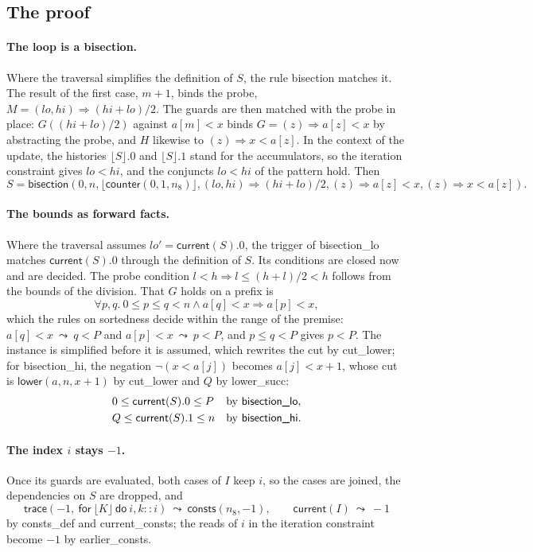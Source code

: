 \documentclass[11pt,a4paper]{article}
\newcommand{\bl}[1]{\lfloor #1\rfloor}                       %
\newcommand{\tr}[3]{\mathsf{trace}(#1,\ \mathsf{for}\ #2\ \mathsf{do}\ #3)}
\newcommand{\cnt}{\mathsf{counter}}
\newcommand{\cur}{\mathsf{current}}
\newcommand{\consts}{\mathsf{consts}}
\newcommand{\lemma}[1]{\textsf{#1}}
\newcommand{\rw}{\ \leadsto\ }
\begin{document}
\subsection{The proof}

\paragraph{The loop is a bisection.} Where the traversal simplifies the definition of $S$, the rule
\lemma{bisection} matches it. The result of the first case, $m + 1$, binds the probe,
$M = (lo, hi) \Rightarrow (hi + lo)/2$. The guards are then matched with the probe in place:
$G((hi + lo)/2)$ against $a[m] < x$ binds $G = (z) \Rightarrow a[z] < x$ by abstracting the probe, and $H$ likewise to
$(z) \Rightarrow x < a[z]$. In the context of the update, the histories $\bl{S}.0$ and $\bl{S}.1$ stand for the
accumulators, so the iteration constraint gives $lo < hi$, and the conjuncts $lo < hi$ of the pattern hold. Then
\[
S = \mathsf{bisection}(0, n, \bl{\cnt(0, 1, n_8)}, (lo, hi) \Rightarrow (hi + lo)/2,
(z) \Rightarrow a[z] < x, (z) \Rightarrow x < a[z]).
\]

\paragraph{The bounds as forward facts.} Where the traversal assumes $lo' = \cur(S).0$, the trigger of
\lemma{bisection\_lo} matches $\cur(S).0$ through the definition of $S$. Its conditions are closed now and are
decided. The probe condition $l < h \Rightarrow l \le (h + l)/2 < h$ follows from the bounds of the division. That $G$
holds on a prefix is
\[
\forall p, q.\ 0 \le p \le q < n \wedge a[q] < x \Rightarrow a[p] < x,
\]
which the rules on sortedness decide within the range of the premise: $a[q] < x \rw q < P$ and $a[p] < x \rw p < P$,
and $p \le q < P$ gives $p < P$. The instance is simplified before it is assumed, which rewrites the cut by
\lemma{cut\_lower}; for \lemma{bisection\_hi}, the negation $\neg(x < a[j])$ becomes $a[j] < x + 1$, whose cut is
$\mathsf{lower}(a, n, x + 1)$ by \lemma{cut\_lower} and $Q$ by \lemma{lower\_succ}:
\begin{align*}
&0 \le \cur(S).0 \le P &&\text{by \lemma{bisection\_lo}},\\
&Q \le \cur(S).1 \le n &&\text{by \lemma{bisection\_hi}}.
\end{align*}

\paragraph{The index $i$ stays $-1$.} Once its guards are evaluated, both cases of $I$ keep $i$, so the cases are
joined, the dependencies on $S$ are dropped, and
\[
\tr{-1}{\bl{K}}{i, k :: i} \rw \consts(n_8, -1), \qquad \cur(I) \rw -1
\]
by \lemma{consts\_def} and \lemma{current\_consts}; the reads of $i$ in the iteration constraint become $-1$ by
\lemma{earlier\_consts}.
\end{document}

